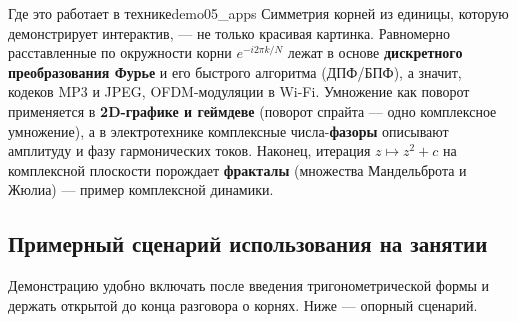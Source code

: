 \begin{remarkIT}{Где это работает в технике}{demo05_apps}
  Симметрия корней из единицы, которую демонстрирует интерактив, — не
  только красивая картинка. Равномерно расставленные по окружности корни
  $e^{-i 2\pi k/N}$ лежат в основе \textbf{дискретного преобразования
  Фурье} и его быстрого алгоритма (ДПФ/БПФ), а значит, кодеков MP3 и
  JPEG, OFDM-модуляции в Wi-Fi. Умножение как поворот применяется в
  \textbf{2D-графике и геймдеве} (поворот спрайта — одно комплексное
  умножение), а в электротехнике комплексные числа-\textbf{фазоры}
  описывают амплитуду и фазу гармонических токов. Наконец, итерация
  $z \mapsto z^2 + c$ на комплексной плоскости порождает
  \textbf{фракталы} (множества Мандельброта и Жюлиа) — пример
  комплексной динамики.
\end{remarkIT}

\subsection*{Примерный сценарий использования на занятии}

Демонстрацию удобно включать после введения тригонометрической формы и
держать открытой до конца разговора о корнях. Ниже — опорный сценарий.

